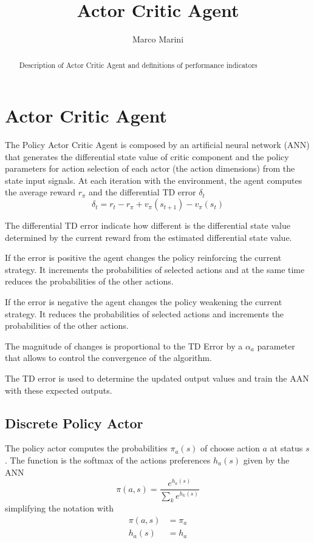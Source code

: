 \documentclass[]{article}
\title{Actor Critic Agent}
\author{Marco Marini}
\begin{document}
\maketitle

\begin{abstract}
Description of Actor Critic Agent and definitions of performance indicators
\end{abstract}

\tableofcontents

\section{Actor Critic Agent}

The Policy Actor Critic Agent is composed by an artificial neural network (ANN) that generates the differential state value of critic component and the policy parameters for action selection of each actor (the action dimensions) from the state input signals.
At each iteration with the environment, the agent computes the average reward $r_\pi$ and the differential TD error $ \delta_t $
\begin{equation}
\delta_t = r_t - r_\pi + v_\pi(s_{t+1}) - v_\pi(s_t)	
\end{equation}

The differential TD error indicate how different is the differential state value determined by the current reward from the estimated differential state value.

If the error is positive the agent changes the policy reinforcing the current strategy. It increments the probabilities of selected actions and at the same time reduces the probabilities of the other actions.

If the error is negative the agent changes the policy weakening the current strategy. It reduces the probabilities of selected actions and increments the probabilities of the other actions.

The magnitude of changes is proportional to the TD Error by a $ \alpha_a $ parameter that allows to control the convergence of the algorithm.

The TD error is used to determine the updated  output values and train the AAN with these expected outputs.

\subsection{Discrete Policy Actor}

The policy actor computes the probabilities $ \pi_a(s) $ of choose action $ a $ at status $ s $.
The function is the softmax of the actions preferences $ h_a(s) $ given by the ANN 
\begin{equation}
	\pi(a, s) = \frac{e^{h_a(s)}}{\sum_k e^{h_k(s)}}
\end{equation}
simplifying the notation with
\begin{align*}
	\pi(a, s) & = \pi_a
	\\
	h_a(s) & = h_a
\end{align*}
\end{document}
